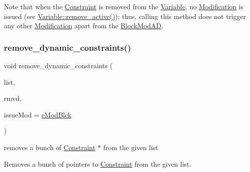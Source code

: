 Note that when the \mbox{\hyperlink{class_s_m_spp__di__unipi__it_1_1_constraint}{Constraint}} is removed from the \mbox{\hyperlink{class_s_m_spp__di__unipi__it_1_1_variable}{Variable}}, no \mbox{\hyperlink{class_s_m_spp__di__unipi__it_1_1_modification}{Modification}} is issued (see \mbox{\hyperlink{class_s_m_spp__di__unipi__it_1_1_variable_a2e531111ee80083b60e8b3775ad3ce4f}{Variable\+::remove\+\_\+active()}}); thus, calling this method does not trigger any other \mbox{\hyperlink{class_s_m_spp__di__unipi__it_1_1_modification}{Modification}} apart from the \mbox{\hyperlink{class_s_m_spp__di__unipi__it_1_1_block_mod_a_d}{Block\+Mod\+AD}}. \mbox{\label{class_s_m_spp__di__unipi__it_1_1_block_acd2feed47c85ecb4cbd6cc4b3f6bbf58}} 
\subsubsection{\texorpdfstring{remove\+\_\+dynamic\+\_\+constraints()}{remove\_dynamic\_constraints()}\hspace{0.1cm}{\footnotesize\ttfamily [2/2]}}
{\footnotesize\ttfamily void remove\+\_\+dynamic\+\_\+constraints (\begin{DoxyParamCaption}\item[{std\+::list$<$ Const $\ast$$>$ \&}]{list,  }\item[{std\+::vector$<$ typename std\+::list$<$ Const $\ast$$>$\+::const\+\_\+iterator $>$ \&}]{rmvd,  }\item[{\mbox{\hyperlink{group___modification___t_y_p_e_s_ga544246d8c462e9a2d817c2c30797968f}{c\+\_\+\+Mod\+Param}}}]{issue\+Mod = {\ttfamily \mbox{\hyperlink{group___modification___t_y_p_e_s_gga48fddcdd03a03f49b7e389ca1ed938d4a21b14b26b1c0093a0905f6fc010bad29}{e\+Mod\+Blck}}} }\end{DoxyParamCaption})}



removes a bunch of \mbox{\hyperlink{class_s_m_spp__di__unipi__it_1_1_constraint}{Constraint}} $\ast$ from the given list 

Removes a bunch of pointers to \mbox{\hyperlink{class_s_m_spp__di__unipi__it_1_1_constraint}{Constraint}} from the given list.

